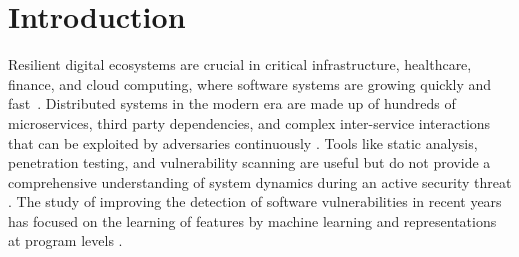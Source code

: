 \documentclass[pdflatex,sn-mathphys-num]{sn-jnl}%
\theoremstyle{thmstyleone}%
\theoremstyle{thmstyletwo}%
\theoremstyle{thmstylethree}%
\begin{document}
	
	
	\maketitle
	
	\section{Introduction}
	Resilient digital ecosystems are crucial in critical infrastructure, healthcare, finance, and cloud computing, where software systems are growing quickly and fast~\cite{basiri2016chaos}. Distributed systems in the modern era are made up of hundreds of microservices, third party dependencies, and complex inter-service interactions that can be exploited by adversaries continuously \cite{myrbakken2020security}. Tools like static analysis, penetration testing, and vulnerability scanning are useful but do not provide a comprehensive understanding of system dynamics during an active security threat \cite{shortridge2023security}. The study of improving the detection of software vulnerabilities in recent years has focused on the learning of features by machine learning and representations at program levels \cite{tong2026osel}. 
	
\end{document}
